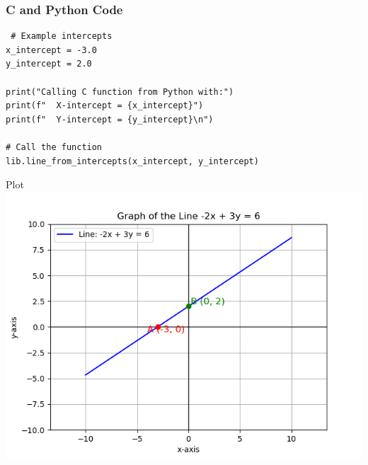 \documentclass{beamer}
\begin{document}
\begin{frame}[fragile]
\frametitle{C and Python Code}
\begin{lstlisting}
 # Example intercepts
x_intercept = -3.0
y_intercept = 2.0

print("Calling C function from Python with:")
print(f"  X-intercept = {x_intercept}")
print(f"  Y-intercept = {y_intercept}\n")

# Call the function
lib.line_from_intercepts(x_intercept, y_intercept)
\end{lstlisting}
\end{frame}

\begin{frame}{Plot}
    \centering
    \includegraphics[width=\columnwidth, height=0.8\textheight, keepaspectratio]{Figure_6.png}     
\end{frame}
\end{document}
